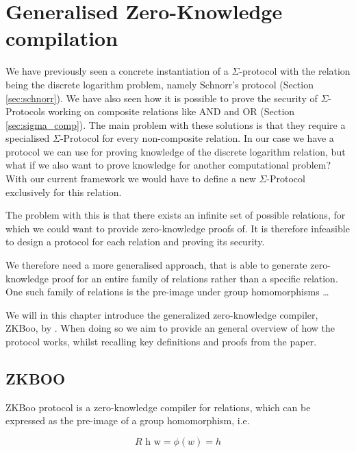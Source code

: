 \chapter{Generalised Zero-Knowledge compilation}
\label{ch:general_zk}
We have previously seen a concrete instantiation of a $\Sigma$-protocol with the
relation being the discrete logarithm problem, namely Schnorr's protocol
(Section \ref{sec:schnorr}).
We have also seen how it is possible to prove the security of $\Sigma$-Protocols
working on composite relations like AND and OR (Section \ref{sec:sigma_comp}).
The main problem with these solutions is that they require a specialised
$\Sigma$-Protocol for every non-composite relation. In our case we have a
protocol we can use for proving knowledge of the discrete logarithm relation,
but what if we also want to prove knowledge for another computational problem?
With our current framework we would have to define a new $\Sigma$-Protocol
exclusively for this relation.

The problem with this is that there exists an infinite set of possible
relations, for which we could want to provide zero-knowledge proofs of. It is
therefore infeasible to design a protocol for each relation and proving its
security.

We therefore need a more generalised approach, that is able to generate
zero-knowledge proof for an entire family of relations rather than a specific relation.
One such family of relations is the pre-image under group homomorphisms \dots

We will in this chapter introduce the generalized zero-knowledge compiler,
ZKBoo, by \citet{zkboo}. When doing so we aim to provide an general overview
of how the protocol works, whilst recalling key definitions and proofs from the paper.

\section{ZKBOO}
\label{sec:zkboo}
ZKBoo protocol is a zero-knowledge compiler for relations, which can be
expressed as the pre-image of a group homomorphism, i.e.

\[
  R \text{ h w} = \phi(w) = h
\]

